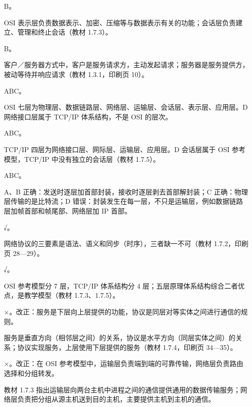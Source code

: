 \documentclass[a4paper,11pt]{article}
\begin{document}
\q B。\begin{analysis}OSI 表示层负责数据表示、加密、压缩等与数据表示有关的功能；会话层负责建立、管理和终止会话（教材 1.7.3）。\end{analysis}

\q B。\begin{analysis}客户／服务器方式中，客户是服务请求方，主动发起请求；服务器是服务提供方，被动等待并响应请求（教材 1.3.1，印刷页 10）。\end{analysis}


\q ABC。\begin{analysis}OSI 七层为物理层、数据链路层、网络层、运输层、会话层、表示层、应用层。D 网络接口层属于 TCP/IP 体系结构，不是 OSI 的层次。\end{analysis}

\q ABC。\begin{analysis}TCP/IP 四层为网络接口层、网际层、运输层、应用层。D 会话层属于 OSI 参考模型，TCP/IP 中没有独立的会话层（教材 1.7.5）。\end{analysis}

\q ABC。\begin{analysis}A、B 正确：发送时逐层加首部封装，接收时逐层剥去首部解封装；C 正确：物理层传输的是比特流；D 错误：封装发生在每一层，不只是运输层，例如数据链路层加帧首部和帧尾部、网络层加 IP 首部。\end{analysis}


\q √。\begin{analysis}网络协议的三要素是语法、语义和同步（时序），三者缺一不可（教材 1.7.2，印刷页 28—29）。\end{analysis}

\q √。\begin{analysis}OSI 参考模型分 7 层，TCP/IP 体系结构分 4 层；五层原理体系结构综合二者优点，是教学模型（教材 1.7.3、1.7.5）。\end{analysis}

\q ×。改正：服务是下层向上层提供的功能，协议是同层对等实体之间进行通信的规则。\begin{analysis}服务是垂直方向（相邻层之间）的关系，协议是水平方向（同层实体之间）的关系；协议实现服务，上层使用下层提供的服务（教材 1.7.4，印刷页 34—35）。\end{analysis}

\q ×。改正：在 OSI 参考模型中，运输层负责端到端的可靠传输，网络层负责路由选择和分组转发。\begin{analysis}教材 1.7.3 指出运输层向两台主机中进程之间的通信提供通用的数据传输服务；网络层负责把分组从源主机送到目的主机，主要提供主机到主机的通信。\end{analysis}
\end{document}
